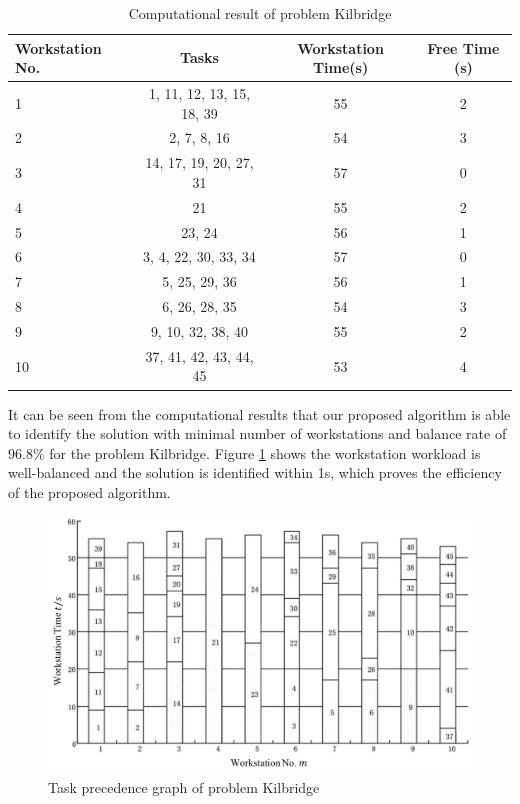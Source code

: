 \begin{table}[h!]
	\begin{center}
		\caption{Computational result of problem Kilbridge}
		\label{tab:tab1}
		\begin{tabular}{l|c|c|c}
			\hline
			\textbf{Workstation No.} & \textbf{Tasks} & \textbf{Workstation Time(s)} & \textbf{Free Time (s)}\\
			\hline
			1 & 1, 11, 12, 13, 15, 18, 39 & 55 & 2\\
			\hline
			2 & 2, 7, 8, 16 & 54 & 3\\
			\hline
			3 & 14, 17, 19, 20, 27, 31 & 57 & 0\\
			\hline
			4 & 21 & 55 & 2 \\
			\hline
			5 & 23, 24 & 56 & 1 \\
			\hline
			6 & 3, 4, 22, 30, 33, 34 & 57 & 0 \\
			\hline
			7 & 5, 25, 29, 36 & 56 & 1\\
			\hline
			8 & 6, 26, 28, 35 & 54 & 3 \\
			\hline
			9 & 9, 10, 32, 38, 40 & 55 & 2\\
			\hline
			10 & 37, 41, 42, 43, 44, 45 & 53 & 4\\
			\hline
		\end{tabular}
	\end{center}
\end{table}

It can be seen from the computational results that our proposed algorithm is able to identify the solution with minimal number of workstations and balance rate of 96.8\% for the problem Kilbridge.
Figure \ref{fig:fig2} shows the workstation workload is well-balanced and the solution is identified within 1s, which proves the efficiency of the proposed algorithm.



\begin{figure}[h!]
	\begin{center}
		\includegraphics[width=0.8\linewidth]{sections/figure2.png}
		\caption{Task precedence graph of problem Kilbridge}
		\label{fig:fig2}
	\end{center}
\end{figure}


